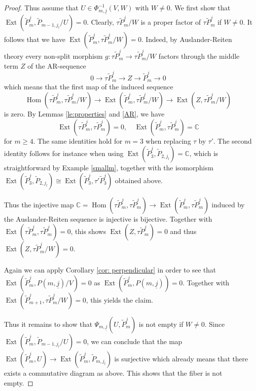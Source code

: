 \documentclass{amsart}
\newcommand{\uj}{\underline j}
\newcommand{\CC}{\mathbb{C}}
\newcommand{\kk}{\Bbbk}
\newcommand{\Ext}{\operatorname{Ext}}
\newcommand{\Hom}{\operatorname{Hom}}
\newcommand{\ses}[3]{0\rightarrow #1\rightarrow #2\rightarrow#3\rightarrow 0}
\begin{document}
\begin{proof}
Thus assume that $U\in\Phi_{m,\uj}^{-1}(V,W)$ with $W\neq 0$. We first show that $\Ext(\tilde P_{m}^{\uj},\tilde P_{m-1,j_l}/U)= 0$. Clearly, $\tau\tilde P_{m}^{\uj}/W$ is a proper factor of $\tau \tilde P_{m}^{\uj}$ if $W\neq 0$. 
It follows that we have $\Ext(\tilde P_{m}^{\uj},\tau\tilde P_{m}^{\uj}/W)=0$. Indeed, by Auslander-Reiten theory every non-split morphism $g:\tau\tilde P_{m}^{\uj}\to \tau\tilde P_{m}^{\uj}/W$ factors through the middle term $Z$ of the AR-sequence 
\[\ses{\tau\tilde P_{m}^{\uj}}{Z}{\tilde P_{m}^{\uj}}\]
which means that the first map of the induced sequence
\[\Hom(\tau\tilde P_{m}^{\uj},\tau\tilde P_{m}^{\uj}/W)\to\Ext(\tilde P_{m}^{\uj},\tau\tilde P_{m}^{\uj}/W)\to\Ext(Z,\tau\tilde P_{m}^{\uj}/W) \]
is zero. By Lemmas \ref{le:properties} and \ref{AR}, we have 
$$\Ext(\tau\tilde P_m^{\uj},\tau\tilde P_m^{\uj})=0,\quad \Ext(\tilde P_m^{\uj},\tau\tilde P_m^{\uj})=\CC$$
for $m\geq 4$. The same identities hold for $m=3$ when replacing $\tau$ by $\tau'$. The second identity follows for instance when using $\Ext(\tilde P_{3}^{\uj},\tilde P_{2,j_l})=\CC$, which is straightforward by Example \ref{smallm}, together with the isomorphism $\Ext(\tilde P_{3}^{\uj},\tilde P_{2,j_l})\cong\Ext(\tilde P_{3}^{\uj},\tau'\tilde P_{3}^{\uj})$ obtained above.

Thus the injective map $\CC=\Hom(\tau \tilde P_{m}^{\uj},\tau \tilde P_{m}^{\uj})\to\Ext(\tilde P_{m}^{\uj},\tau \tilde P_{m}^{\uj})$ induced by the Auslander-Reiten sequence is injective is bijective. Together with $\Ext(\tau \tilde P_{m}^{\uj},\tau \tilde P_{m}^{\uj})=0$, this shows $\Ext(Z,\tau\tilde P_{m}^{\uj})=0$ and thus $\Ext(Z,\tau\tilde P_{m}^{\uj}/W)=0$.



Again we can apply Corollary \ref{cor: perpendicular} in order to see that $\Ext(\tilde P_{m}^{\uj},P(m,\uj)/V)=0$ as $\Ext(\tilde P_{m}^{\uj},P(m,\uj))=0$. 
 Together with $\Ext(\tilde P_{m+1}^{\uj},\tau\tilde P_{m}^{\uj}/W)=0$, this yields the claim.

Thus it remains to show that $\Psi_{m,\uj}(U,\tilde P_{m}^{\uj})$ is not empty if $W\neq 0$. Since $\Ext(\tilde P_{m}^{\uj},\tilde P_{m-1,j_l}/U)= 0$, we can conclude that the map $\Ext(\tilde P_{m}^{\uj},U)\to\Ext(\tilde P_{m}^{\uj},\tilde P_{m,j_l})$ is surjective which already means that there exists a commutative diagram as above. This shows that the fiber is not empty.
\end{proof}
\end{document}
